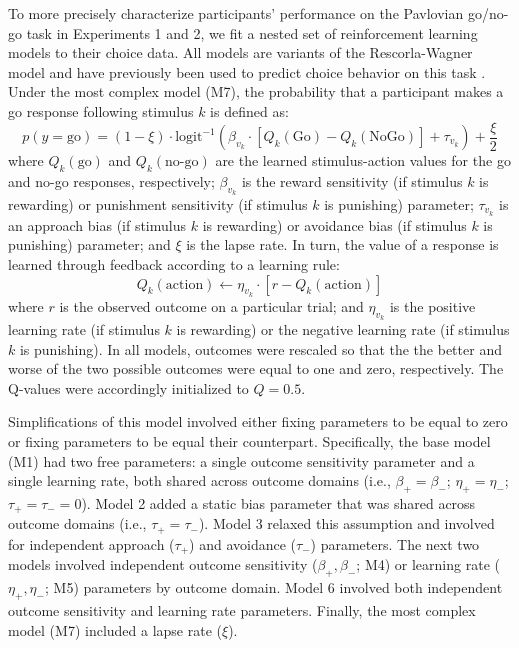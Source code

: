 \documentclass[a4paper,12pt]{article}
\begin{document}
\begin{refsection}[supp]
To more precisely characterize participants' performance on the Pavlovian go/no-go task in Experiments 1 and 2, we fit a nested set of reinforcement learning models to their choice data.  All models are variants of the Rescorla-Wagner model and have previously been used to predict choice behavior on this task \cite{guitart2012go, mkrtchian2017modeling, moutoussis2018change, swart2017catecholaminergic}. Under the most complex model (M7), the probability that a participant makes a go response following stimulus $k$ is defined as:
\begin{equation}
    p(y = \text{go}) = (1 - \xi) \cdot \text{logit}^{-1} \left( \beta_{v_k} \cdot [Q_k(\text{Go}) - Q_k(\text{NoGo})] + \tau_{v_k} \right) + \frac{\xi}{2}
\end{equation}
where $Q_k(\text{go})$ and $Q_k(\text{no-go})$ are the learned stimulus-action values for the go and no-go responses, respectively; $\beta_{v_k}$ is the reward sensitivity (if stimulus $k$ is rewarding) or punishment sensitivity (if stimulus $k$ is punishing) parameter; $\tau_{v_k}$ is an approach bias (if stimulus $k$ is rewarding) or avoidance bias (if stimulus $k$ is punishing) parameter; and $\xi$ is the lapse rate. In turn, the value of a response is learned through feedback according to a learning rule:
\begin{equation}
    Q_k(\text{action}) \leftarrow \eta_{v_k} \cdot \left[ r - Q_k(\text{action}) \right]
\end{equation}
where $r$ is the observed outcome on a particular trial; and $\eta_{v_k}$ is the positive learning rate (if stimulus $k$ is rewarding) or the negative learning rate (if stimulus $k$ is punishing). In all models, outcomes were rescaled so that the the better and worse of the two possible outcomes were equal to one and zero, respectively. The Q-values were accordingly initialized to $Q = 0.5$. 

Simplifications of this model involved either fixing parameters to be equal to zero or fixing parameters to be equal their counterpart. Specifically, the base model (M1) had two free parameters: a single outcome sensitivity parameter and a single learning rate, both shared across outcome domains (i.e., $\beta_+ = \beta_-$; $\eta_+ = \eta_-$; $\tau_+ = \tau_- = 0$). Model 2 added a static bias parameter that was shared across outcome domains (i.e., $\tau_+ = \tau_-$). Model 3 relaxed this assumption and involved for independent approach ($\tau_+$) and avoidance ($\tau_-$) parameters. The next two models involved independent outcome sensitivity ($\beta_+, \beta_-$; M4) or learning rate ($\eta_+, \eta_-$; M5) parameters by outcome domain. Model 6 involved both independent outcome sensitivity and learning rate parameters. Finally, the most complex model (M7) included a lapse rate ($\xi$).


\end{refsection}
\end{document}
